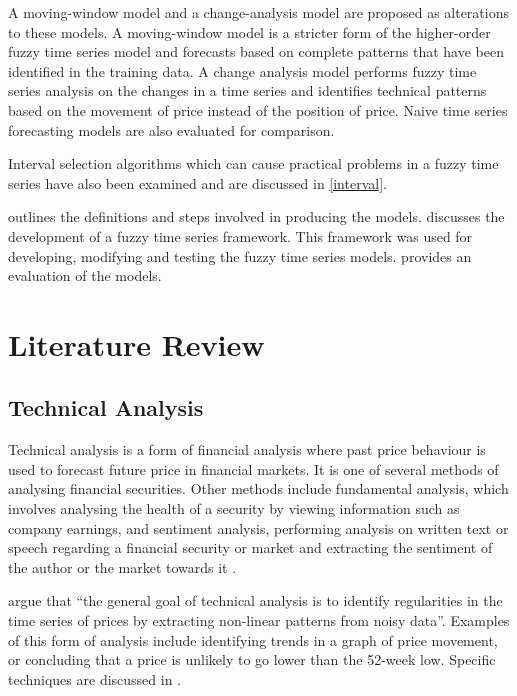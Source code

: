 \documentclass[12pt, oneside, a4paper]{article}
\theoremstyle{definition}
\begin{document}
A moving-window model and a change-analysis model are proposed as alterations to these models. A moving-window model is a stricter form of the higher-order fuzzy time series model and forecasts based on complete patterns that have been identified in the training data. A change analysis model performs fuzzy time series analysis on the changes in a time series and identifies technical patterns based on the movement of price instead of the position of price. Naive time series forecasting models are also evaluated for comparison. 

Interval selection algorithms which can cause practical problems in a fuzzy time series have also been examined and are discussed in \cref{interval}.

 outlines the definitions and steps involved in producing the models.  discusses the development of a fuzzy time series framework. This framework was used for developing, modifying and testing the fuzzy time series models.  provides an evaluation of the models.

\section{Literature Review}

\subsection{Technical Analysis}
\label{ta}

Technical analysis is a form of financial analysis where past price behaviour is used to forecast future price in financial markets. It is one of several methods of analysing financial securities. Other methods include fundamental analysis, which involves analysing the health of a security by viewing information such as company earnings, and sentiment analysis, performing analysis on written text or speech regarding a financial security or market and extracting the sentiment of the author or the market towards it \citep{ahmad2011affective}.

\cite{foundations} argue that ``the general goal of technical analysis is to identify regularities in the time series of prices by extracting non-linear patterns from noisy data''. Examples of this form of analysis include identifying trends in a graph of price movement, or concluding that a price is unlikely to go lower than the 52-week low. Specific techniques are discussed in .
\end{document}
